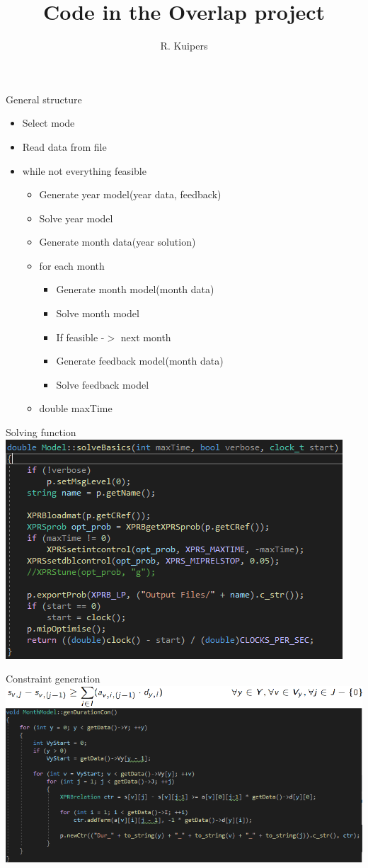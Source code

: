 \documentclass{beamer}
\title[Code]{Code in the Overlap project}
\author{R. Kuipers}
\begin{document}
\begin{frame}{General structure}
\begin{itemize}
\item Select mode
\item Read data from file
\item while not everything feasible
	\begin{itemize}
	\item Generate year model(year data, feedback)
	\item Solve year model
	\item Generate month data(year solution)
	\item for each month
		\begin{itemize}
		\item Generate month model(month data)
		\item Solve month model
		\item If feasible -$>$ next month
		\item Generate feedback model(month data)
		\item Solve feedback model	
		\end{itemize}
	\item double maxTime
	\end{itemize}
\end{itemize}
\end{frame}

\begin{frame}{Solving function}
\includegraphics[width=\textwidth]{solve}
\end{frame}

\begin{frame}{Constraint generation}
\includegraphics[width=\textwidth]{constraint}
\end{frame}
\end{document}
